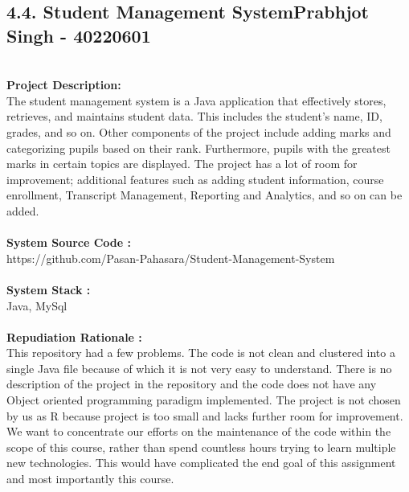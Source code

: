 \documentclass[letterpaper, 11pt]{report}
\begin{document}
\subsection*{4.4. Student Management System\hfill {\normalsize{Prabhjot Singh - 40220601}}} \\
\normalsize {\textbf{Project Description:}} \\
\normalsize {The student management system is a Java application that effectively stores, retrieves, and maintains student data. This includes the student's name, ID, grades, and so on. Other components of the project include adding marks and categorizing pupils based on their rank. Furthermore, pupils with the greatest marks in certain topics are displayed. The project has a lot of room for improvement; additional features such as adding student information, course enrollment, Transcript Management, Reporting and Analytics, and so on can be added.}\\
\\
\normalsize{\textbf{System Source Code :}} \\
\normalsize{\: https://github.com/Pasan-Pahasara/Student-Management-System  }\\
\\
\normalsize{\textbf{System Stack :}}\\
\normalsize{Java, MySql}\\
\\
\normalsize{\textbf{Repudiation Rationale : }}\\
\normalsize{This repository had a few problems. The code is not clean and clustered into a single Java file because of which it is not very easy to understand. There is no description of the project in the repository and the code does not have any Object oriented programming paradigm implemented. The project is not chosen by us as R because project is too small and lacks further room for improvement. 
We want to concentrate our efforts on the maintenance of the code within the scope of this course, rather than spend countless hours trying to learn multiple new technologies. This would have complicated the end goal of this assignment and most importantly this course.}
\\
\pagebreak
{}
\end{document}
